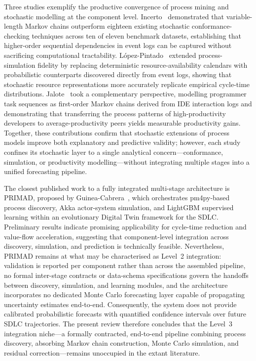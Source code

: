 
Three studies exemplify the productive convergence of process mining and stochastic modelling at the component level. Incerto~\cite{incerto2025} demonstrated that variable-length Markov chains outperform eighteen existing stochastic conformance-checking techniques across ten of eleven benchmark datasets, establishing that higher-order sequential dependencies in event logs can be captured without sacrificing computational tractability. López-Pintado~\cite{lopezpintado2023} extended process-simulation fidelity by replacing deterministic resource-availability calendars with probabilistic counterparts discovered directly from event logs, showing that stochastic resource representations more accurately replicate empirical cycle-time distributions. Jalote~\cite{jalote2021} took a complementary perspective, modelling programmer task sequences as first-order Markov chains derived from IDE interaction logs and demonstrating that transferring the process patterns of high-productivity developers to average-productivity peers yields measurable productivity gains. Together, these contributions confirm that stochastic extensions of process models improve both explanatory and predictive validity; however, each study confines its stochastic layer to a single analytical concern—conformance, simulation, or productivity modelling—without integrating multiple stages into a unified forecasting pipeline.

The closest published work to a fully integrated multi-stage architecture is PRIMAD, proposed by Guinea-Cabrera~\cite{guinea2025}, which orchestrates pm4py-based process discovery, Akka actor-system simulation, and LightGBM supervised learning within an evolutionary Digital Twin framework for the SDLC. Preliminary results indicate promising applicability for cycle-time reduction and value-flow acceleration, suggesting that component-level integration across discovery, simulation, and prediction is technically feasible. Nevertheless, PRIMAD remains at what may be characterised as Level~2 integration: validation is reported per component rather than across the assembled pipeline, no formal inter-stage contracts or data-schema specifications govern the handoffs between discovery, simulation, and learning modules, and the architecture incorporates no dedicated Monte Carlo forecasting layer capable of propagating uncertainty estimates end-to-end. Consequently, the system does not provide calibrated probabilistic forecasts with quantified confidence intervals over future SDLC trajectories. The present review therefore concludes that the Level~3 integration niche—a formally contracted, end-to-end pipeline combining process discovery, absorbing Markov chain construction, Monte Carlo simulation, and residual correction—remains unoccupied in the extant literature.


